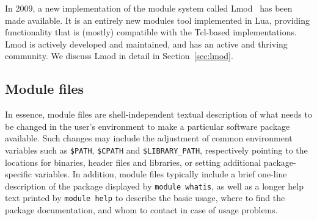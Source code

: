 In 2009, a new implementation of the module system called
Lmod~\cite{taccLmod} has
been made available. It is an entirely new modules tool implemented in
Lua, providing functionality that is (mostly) compatible with the Tcl-based
implementations.  Lmod is actively developed and maintained, and has
an active and thriving community. We discuss Lmod in detail in
Section~\ref{sec:lmod}.


%
%

\subsection{Module files}
\label{sec:Module_files}

In essence, module files are shell-independent textual description of
what needs to be changed in the user's environment to make a
particular software package available. Such changes may include the
adjustment of common environment variables such as \texttt{\small \$PATH},
\texttt{\small \$CPATH} and \texttt{\small \$LIBRARY\_PATH}, respectively pointing
to the locations for binaries, header files and libraries, or setting additional
package-specific variables. In addition,
module files typically include a brief one-line description of the
package displayed by \texttt{\small module whatis}, as well as a longer help
text printed by \texttt{\small module help} to describe the basic usage,
where to find the package documentation, and whom to contact in case
of usage problems.

